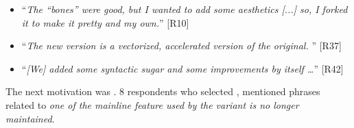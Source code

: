 \begin{itemize}[leftmargin=*]
\item ``\emph{The ``bones'' were good, but I wanted to add some aesthetics [...] %
so, I forked it to make it pretty and my own.}'' [R10]
\item ``\emph{The new version is a vectorized, accelerated version of the original.%
}'' [R37]
\item ``\emph{[We] added some syntactic sugar and some improvements by itself \ldots}'' [R42]
\end{itemize}

\nd The next  motivation was .
8 respondents who selected , mentioned phrases related to \emph{one of the mainline feature used by the variant is no longer maintained}.

